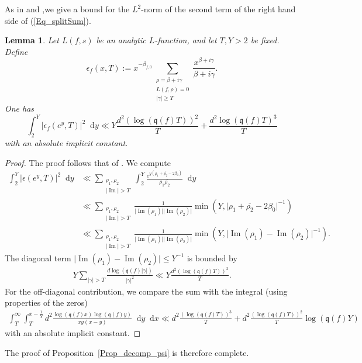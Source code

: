 \documentclass[a4paper,10pt]{amsart}
\theoremstyle{plain}
\newtheorem{lem}[theo]{Lemma}
\theoremstyle{definition}
\begin{document}
As in \cite[Lem. 3.3]{FioEC} and \cite[Lem. 2.2]{RS},we give a bound for the $L^{2}$-norm of the second term of the right hand side of (\ref{Eq_splitSum}).
\begin{lem}\label{Lm_epsilon}
Let $L(f,s)$ be an analytic $L$-function, and let $T,Y>2$ be fixed.
Define
\begin{equation}\label{Def_epsilon}
\epsilon_{f}(x,T):= x^{-\beta_{f,0}}\sum_{\substack{\rho=\beta + i\gamma \\ L(f,\rho)=0 \\ \lvert\gamma\rvert\geq T}}\frac{x^{\beta +i\gamma}}{\beta+ i\gamma}.
\end{equation}
One has
$$\int_{2}^{Y}\lvert \epsilon_{f}(e^{y},T)\rvert^{2} {\mathop{}\!\mathrm{d}} y \ll Y\frac{d^{2}\left(\log(\mathfrak{q}(f)T)\right)^2}{T} + \frac{d^{2}\log(\mathfrak{q}(f)T)^3}{T}$$
with an absolute implicit constant.
\end{lem}

\begin{proof}
The proof follows that of \cite[Lem. 2.2]{RS}.
We compute 
\begin{align*}
	\int_{2}^{Y}\lvert \epsilon(e^{y},T)\rvert^{2} {\mathop{}\!\mathrm{d}} y 
	&\ll \sum_{\substack{\rho_{1},\rho_{2} \\ \lvert\operatorname{Im}\rvert>T}}\int_{2}^{Y}\frac{e^{y(\rho_{1}+\overline{\rho_{2}} - 2\beta_{0})}}{\rho_{1}\overline{\rho_{2}}}{\mathop{}\!\mathrm{d}} y \\
		&\ll  \sum_{\substack{\rho_{1},\rho_{2} \\ \lvert\operatorname{Im}\rvert>T}}\frac{1}{\lvert\operatorname{Im}(\rho_{1})\rvert\lvert\operatorname{Im}(\rho_{2})\rvert}\min(Y,\lvert\rho_{1}+\overline{\rho_{2}} - 2\beta_{0}\rvert^{-1})\\
		&\ll \sum_{\substack{\rho_{1},\rho_{2} \\ \lvert\operatorname{Im}\rvert>T}}\frac{1}{\lvert\operatorname{Im}(\rho_{1})\rvert\lvert\operatorname{Im}(\rho_{2})\rvert}\min(Y,\lvert\operatorname{Im}(\rho_{1}) - \operatorname{Im}(\rho_{2})\rvert^{-1}).
	\end{align*}
	The diagonal term $\lvert\operatorname{Im}(\rho_{1}) - \operatorname{Im}(\rho_{2})\rvert\leq Y^{-1}$ is bounded by
	\begin{align*}
	Y\sum_{\lvert\gamma\rvert >T}\frac{d\log(\mathfrak{q}(f)\lvert\gamma\rvert)}{\lvert\gamma\rvert^{2}} \ll Y\frac{d^{2}\left(\log(\mathfrak{q}(f)T)\right)^{2}}{T}.
	\end{align*}
	For the off-diagonal contribution, we compare the sum with the integral (using properties of the zeros)
\begin{align*}
\int_{T}^{\infty}\int_{T}^{x-\frac{1}{Y}} d^{2}\frac{\log(\mathfrak{q}(f)x)\log(\mathfrak{q}(f)y)}{xy(x-y)}{\mathop{}\!\mathrm{d}} y {\mathop{}\!\mathrm{d}} x
\ll d^{2}\frac{\left(\log(\mathfrak{q}(f)T)\right)^3}{T} + d^{2}\frac{\left(\log(\mathfrak{q}(f)T)\right)^{2}}{T}\log(\mathfrak{q}(f)Y)
\end{align*}
with an absolute implicit constant.
\end{proof}
The proof of Proposition~\ref{Prop_decomp_psi} is therefore complete.
\end{document}
